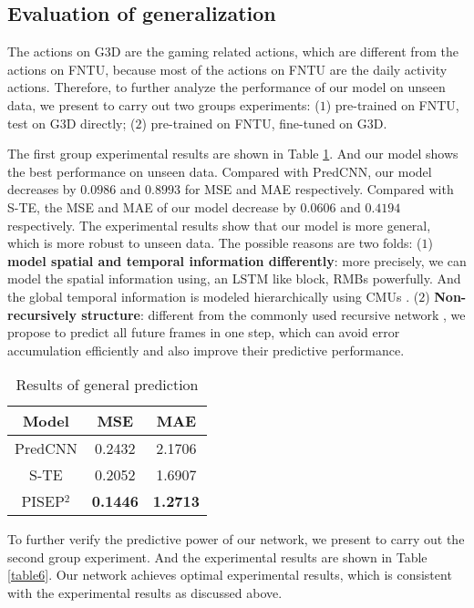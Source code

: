 \documentclass[journal]{IEEEtran}
\begin{document}
\subsection{Evaluation of generalization}
The actions on G${3}$D are the gaming related actions, which are different from the actions on FNTU, because most of the actions on FNTU are the daily activity actions. Therefore, to further analyze the performance of our model on unseen data, we present to carry out two groups experiments: (${1}$) pre-trained on FNTU, test on G${3}$D directly; (${2}$) pre-trained on FNTU, fine-tuned on G${3}$D.

The first group experimental results are shown in Table \ref{table5}. And our model shows the best performance on unseen data. Compared with PredCNN, our model decreases by ${0.0986}$ and ${0.8993}$ for MSE and MAE respectively. Compared with S-TE\cite{ButepageDRL}, the MSE and MAE of our model decrease by ${0.0606}$ and ${0.4194}$ respectively. The experimental results show that our model is more general, which is more robust to unseen data. The possible reasons are two folds: (${1}$) {\bf model spatial and temporal information differently}: more precisely, we can model the spatial information using, an LSTM like block, RMBs \cite{vpn} powerfully. And the global temporal information is modeled hierarchically using CMUs \cite{predcnn}. (${2}$) {\bf Non-recursively structure}: different from the commonly used recursive network \cite{predcnn}, we propose to predict all future frames in one step, which can avoid error accumulation efficiently and also improve their predictive performance.

\begin{table}[!t]
\renewcommand{\arraystretch}{1.3}
\caption{Results of general prediction}
\label{table5}
\centering
\begin{tabular}{ccc}
\hline
Model&MSE&MAE \\
\hline
PredCNN\cite{predcnn}&0.2432&2.1706 \\
S-TE\cite{ButepageDRL}&0.2052&1.6907 \\
PISEP${^2}$ &{\bf 0.1446}&{\bf 1.2713} \\
\hline
\end{tabular}
\end{table}


To further verify the predictive power of our network, we present to carry out the second group experiment. And the experimental results are shown in Table \ref{table6}. Our network achieves optimal experimental results, which is consistent with the experimental results as discussed above.
\end{document}
